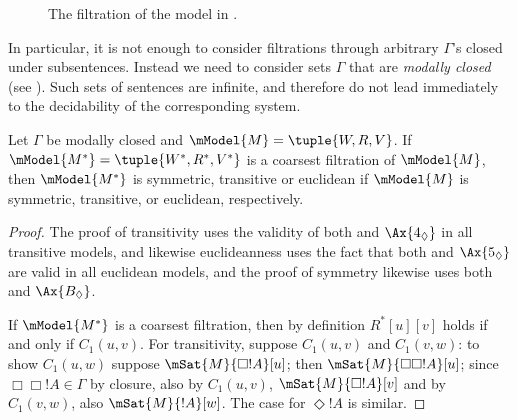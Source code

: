 \documentclass[../../../include/open-logic-section]{subfiles}
\begin{document}
\begin{figure}[ht]
  \centering
  \caption{The filtration of the model in .}
\end{figure}

In particular, it is not enough to consider filtrations through
arbitrary $\Gamma$'s closed under subsentences. Instead we need to
consider sets $\Gamma$ that are \emph{modally closed} (see
). Such sets of sentences are
infinite, and therefore do not lead immediately to the decidability of
the corresponding system.

\begin{thm}
  Let $\Gamma$ be modally closed and $\mModel{M}=\tuple{W,R,V}$. If
  $\mModel{M^*} = \tuple{W^*,R^*,V^*}$ is a coarsest filtration of
  $\mModel{M}$, then $\mModel{M^*}$ is symmetric, transitive or
  euclidean if $\mModel{M}$ is symmetric, transitive, or euclidean,
  respectively.
\end{thm}

\begin{proof}
  The proof of transitivity uses the validity of both  and
  $\Ax{4_\Diamond}$ in all transitive models, and likewise
  euclideanness uses the fact that both  and
  $\Ax{5_\Diamond}$ are valid in all euclidean models, and the
  proof of symmetry likewise uses both  and
  $\Ax{B_\Diamond}$.

  If $\mModel{M^*}$ is a coarsest filtration, then by definition
  $R^*[u][v]$ holds if and only if $C_1(u,v)$. For transitivity,
  suppose $C_1(u,v)$ and $C_1(v,w)$: to show $C_1(u,w)$ suppose
  $\mSat{M}{\Box !A}[u]$; then $\mSat{M}{\Box\Box!A}[u]$; since
  $\Box\Box!A \in \Gamma$ by closure, also by $C_1(u,v)$,
  $\mSat{M}{\Box!A}[v]$ and by $C_1(v,w)$, also $\mSat{M}{!A}[w]$. The
  case for $\Diamond!A$ is similar.
\end{proof}
\end{document}
